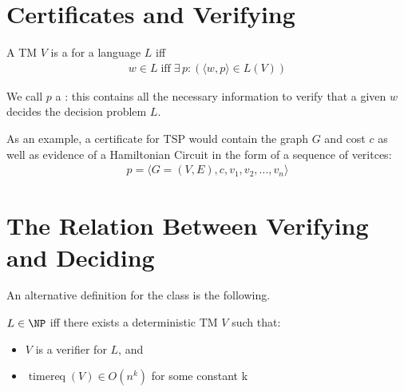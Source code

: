 \documentclass[a4paper]{report}
\newcommand{\bookref}[3]{\marginpar{\faBook{}~#1\\Chapter #2\\Section #3}}
\theoremstyle{definition}
\DeclareMathOperator*{\treq}{timereq}
\begin{document}
\section{Certificates and Verifying}
A TM $V$ is a  for a language $L$ iff
%
\begin{align*}
w \in L \; \text{iff} \; \exists \, p : (\langle w, p \rangle \in L(V))
\end{align*}

We call $p$ a : this contains all the necessary information to verify that a given $w$ decides the decision problem $L$.

As an example, a certificate for TSP would contain the graph $G$ and cost $c$ as well as evidence of a Hamiltonian Circuit in the form of a sequence of veritces:
%
\begin{align*}
p = \langle G = (V,E), c, v_1, v_2, \dots, v_n \rangle
\end{align*}


\section{The Relation Between Verifying and Deciding}
\bookref{ER}{28}{28.2.1}
An alternative definition for the class \NP{} is the following.

$L \in \NP$ iff there exists a deterministic TM $V$ such that:
\begin{itemize}
\item $V$ is a verifier for $L$, and 
\item $\treq(V) \in O(n^k)$ for some constant k
\end{itemize}
\end{document}
